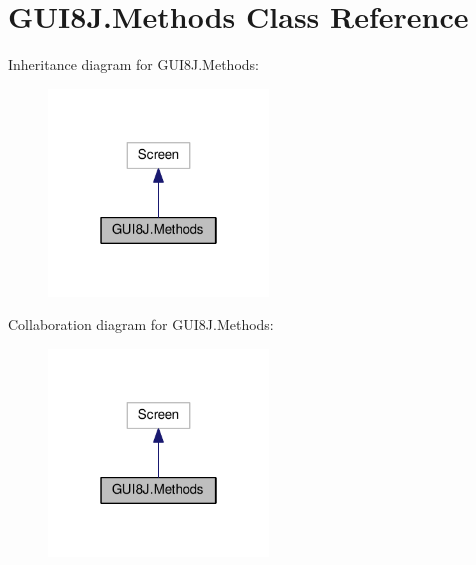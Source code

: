 \hypertarget{classGUI8J_1_1Methods}{}\section{G\+U\+I8\+J.\+Methods Class Reference}
\label{classGUI8J_1_1Methods}


Inheritance diagram for G\+U\+I8\+J.\+Methods\+:\nopagebreak
\begin{figure}[H]
\begin{center}
\leavevmode
\includegraphics[width=166pt]{classGUI8J_1_1Methods__inherit__graph}
\end{center}
\end{figure}


Collaboration diagram for G\+U\+I8\+J.\+Methods\+:\nopagebreak
\begin{figure}[H]
\begin{center}
\leavevmode
\includegraphics[width=166pt]{classGUI8J_1_1Methods__coll__graph}
\end{center}
\end{figure}
